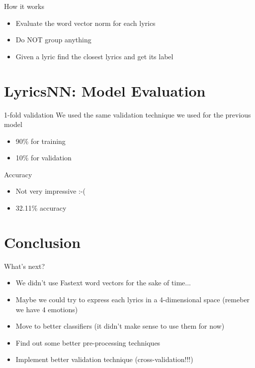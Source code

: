 \documentclass[xcolor=dvipsnames]{beamer}
\begin{document}
\begin{frame}{How it works}
\begin{itemize}
\item Evaluate the word vector norm for each lyrics
\item Do NOT group anything
\item Given a lyric find the closest lyrics and get its label
\end{itemize}
\end{frame}

\section{LyricsNN: Model Evaluation}

\begin{frame}{1-fold validation}
We used the same validation technique we used for the previous model
\begin{itemize}
\item 90\% for training
\item 10\% for validation
\end{itemize}
\end{frame}

\begin{frame}{Accuracy}
\begin{itemize}
\item Not very impressive :-(
\item 32.11\% accuracy
\end{itemize}
\end{frame}

\section{Conclusion}

\begin{frame}{What's next?}
\begin{itemize}
\item We didn't use Fastext word vectors for the sake of time...
\item Maybe we could try to express each lyrics in a 4-dimensional space (remeber we have 4 emotions)
\item Move to better classifiers (it didn't make sense to use them for now)
\item Find out some better pre-processing techniques
\item Implement better validation technique (cross-validation!!!)
\end{itemize}
\end{frame}
\end{document}
